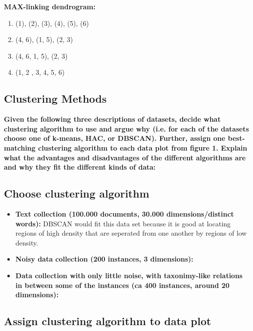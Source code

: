 		{\bf MAX-linking dendrogram:}
			\begin{enumerate}
				\item (1), (2), (3), (4), (5), (6)
				\item (4, 6), (1,  5), (2, 3)
				\item (4, 6, 1, 5), (2, 3)
				\item (1, 2 , 3, 4, 5, 6)
			\end{enumerate}


 
	\clearpage
	\subsection{Clustering Methods}
		{\bf Given the following three descriptions of datasets, decide what clustering algorithm
		to use and argue why (i.e. for each of the datasets choose one of k-means, HAC, or DBSCAN).
		Further, assign one best-matching clustering algorithm to each data plot from figure 1. Explain
		what the advantages and disadvantages of the different algorithms are and why they fit
		the different kinds of data:}

		\noindent\makebox[\linewidth]{\rule{\textwidth}{1pt}} 

		\subsection*{Choose clustering algorithm}
		
		\begin{itemize}
			\item {\bf Text collection (100.000 documents, 30.000 dimensions/distinct words):}
			DBSCAN would fit this data set because it is good at locating regions of high density that
			are seperated from one another by regions of low density. 
			\item {\bf Noisy data collection (200 instances, 3 dimensions):}
			\item {\bf Data collection with only little noise, with taxonimy-like relations in 
			between some of the instances (ca 400 instances, around 20 dimensions):}
		\end{itemize}

		\noindent\makebox[\linewidth]{\rule{\textwidth}{1pt}} 

		\subsection*{Assign clustering algorithm to data plot}


